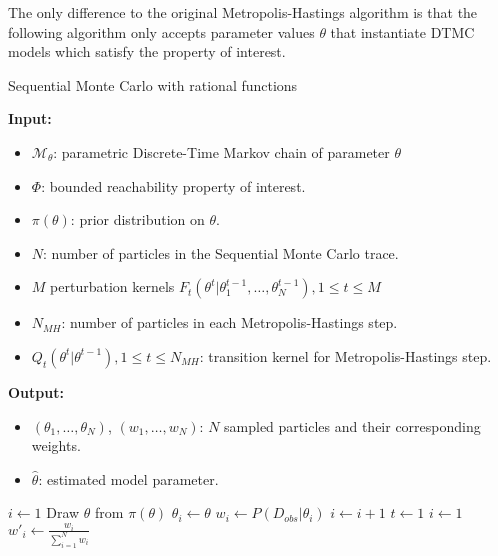 The only difference to the original Metropolis-Hastings algorithm is that the following algorithm
only accepts parameter values $\theta$ that instantiate DTMC models which satisfy the property of
interest.
\begin{algorithm}[H]
    \caption{Sequential Monte Carlo with rational functions}
    \label{alg:rf-smc}
    \footnotesize{
        \hspace*{\algorithmicindent} \textbf{Input:}
        \begin{itemize}[noitemsep,topsep=0pt]
            \item $\mathcal{M}_\theta$: parametric Discrete-Time Markov chain of parameter $\theta$
            \item $\Phi$: bounded reachability property of interest.
            \item $\pi(\theta)$: prior distribution on $\theta$.
            \item $N$: number of particles in the Sequential Monte Carlo trace.
            \item $M$ perturbation kernels $F_t(\theta^t | \theta^{t-1}_1,\ldots,\theta^{t-1}_N), 1\leq t \leq M$
            \item $N_{MH}$: number of particles in each Metropolis-Hastings step.
            \item $Q_t(\theta^t|\theta^{t-1}), 1 \leq t \leq N_{MH}$: transition kernel for Metropolis-Hastings step.
        \end{itemize}
        \hspace*{\algorithmicindent} \textbf{Output:}
        \begin{itemize}[noitemsep,topsep=0pt]
            \item $(\theta_1,\ldots,\theta_N)$, $(w_1,\ldots,w_N)$: $N$ sampled particles and their corresponding weights.
            \item $\hat{\theta}$: estimated model parameter.
        \end{itemize}
    }
    \begin{algorithmic}[1]
        \State $i \leftarrow 1$
         
        \State Draw $\theta$ from $\pi(\theta)$
        \State $\theta_i \leftarrow \theta$
        \State $w_i \leftarrow P(D_{obs}|\theta_i)$
        \State $i \leftarrow i + 1$
        \EndWhile
        \State $t \leftarrow 1$
        \State $i \leftarrow 1$ 
        \State $w'_i \leftarrow \frac{w_i}{\sum_{i=1}^N w_i} $

\end{algorithmic}
\end{algorithm}
